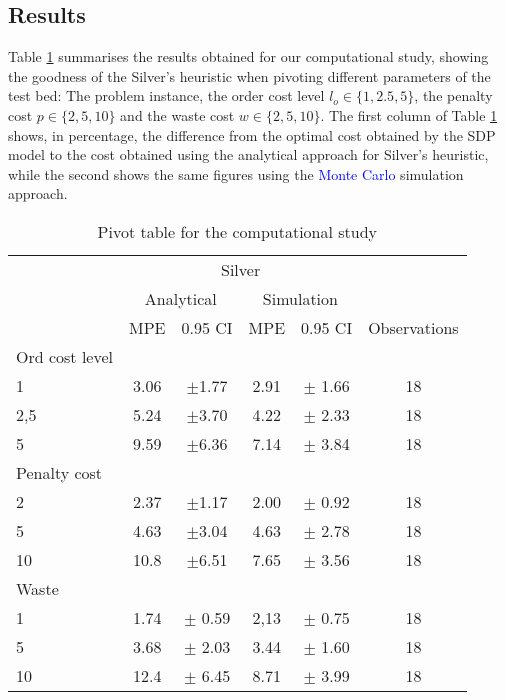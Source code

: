 \documentclass{tPRS2e}
\newcommand{\blue}{\textcolor{blue}}
\begin{document}
\subsection{Results}
\label{sec:results}
Table \ref{tab:pivot} summarises the results obtained for our computational study, showing the goodness of the Silver's heuristic when pivoting different parameters of the test bed: The problem instance, the order cost level $l_o \in \{1, 2.5, 5\}$, the penalty cost $p \in \{2, 5, 10\}$ and the waste cost $w \in \{2, 5, 10\}$. The first column of Table \ref{tab:pivot} shows, in percentage, the difference from the  optimal cost obtained by the SDP model to the cost obtained using the analytical approach for Silver's heuristic\blue{}, while the second shows the same figures using the \blue{Monte Carlo} simulation approach. 
\begin{table}[]
\centering
\caption{Pivot table for the computational study}
\label{tab:pivot}
\begin{tabular}{lcc|cc|c}
              & \multicolumn{4}{c}{Silver}                                      \\ 
              \cline{2-5} 
              & \multicolumn{2}{c}{Analytical} & \multicolumn{2}{c}{Simulation} \\ \hline
              & MPE  & 0.95 CI          & MPE    & 0.95 CI & Observations           \\ \hline
Ord cost level &     &                  &        & \\          
1             & 3.06 & $\pm$1.77		& 2.91   & $\pm$ 1.66  &18 \\
2,5           & 5.24 & $\pm$3.70		& 4.22   & $\pm$ 2.33  &18 \\
5             & 9.59 & $\pm$6.36		& 7.14   & $\pm$ 3.84  &18 \\ \hline
Penalty cost   & & &  &          \\
2             & 2.37 & $\pm$1.17		& 2.00	 & $\pm$ 0.92  &18 \\
5             & 4.63 & $\pm$3.04		& 4.63	 & $\pm$ 2.78  &18 \\
10            & 10.8 & $\pm$6.51		& 7.65	 & $\pm$ 3.56  &18 \\ \hline
Waste        & & &  &     \\  
1             & 1.74 & $\pm$ 0.59	& 2,13   &$\pm$  0.75  &18 \\
5             & 3.68 & $\pm$	2.03	& 3.44   &$\pm$  1.60  &18 \\
10            & 12.4 & $\pm$	6.45	& 8.71   &$\pm$  3.99  &18 \\ \hline

\end{tabular}
\end{table}
\end{document}
